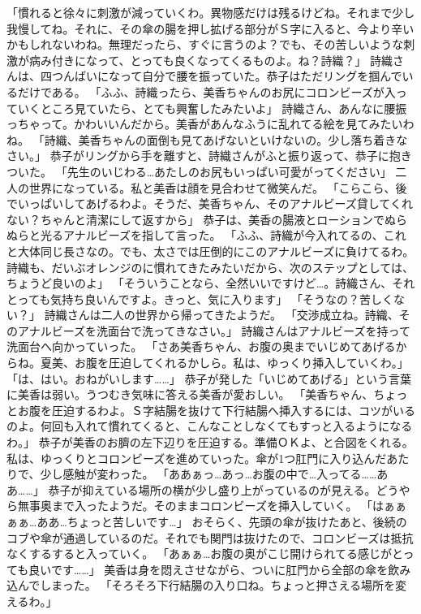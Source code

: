 「慣れると徐々に刺激が減っていくわ。異物感だけは残るけどね。それまで少し我慢してね。それに、その傘の腸を押し拡げる部分がＳ字に入ると、今より辛いかもしれないわね。無理だったら、すぐに言うのよ？でも、その苦しいような刺激が病み付きになって、とっても良くなってくるものよ。ね？詩織？」
詩織さんは、四つんばいになって自分で腰を振っていた。恭子はただリングを掴んでいるだけである。
「ふふ、詩織ったら、美香ちゃんのお尻にコロンビーズが入っていくところ見ていたら、とても興奮したみたいよ」
詩織さん、あんなに腰振っちゃって。かわいいんだから。美香があんなふうに乱れてる絵を見てみたいわね。
「詩織、美香ちゃんの面倒も見てあげないといけないの。少し落ち着きなさい。」
恭子がリングから手を離すと、詩織さんがふと振り返って、恭子に抱きついた。
「先生のいじわる…あたしのお尻もいっぱい可愛がってください」
二人の世界になっている。私と美香は顔を見合わせて微笑んだ。
「こらこら、後でいっぱいしてあげるわよ。そうだ、美香ちゃん、そのアナルビーズ貸してくれない？ちゃんと清潔にして返すから」
恭子は、美香の腸液とローションでぬらぬらと光るアナルビーズを指して言った。
「ふふ、詩織が今入れてるの、これと大体同じ長さなの。でも、太さでは圧倒的にこのアナルビーズに負けてるわ。詩織も、だいぶオレンジのに慣れてきたみたいだから、次のステップとしては、ちょうど良いのよ」
「そういうことなら、全然いいですけど…。詩織さん、それとっても気持ち良いんですよ。きっと、気に入ります」
「そうなの？苦しくない？」
詩織さんは二人の世界から帰ってきたようだ。
「交渉成立ね。詩織、そのアナルビーズを洗面台で洗ってきなさい。」
詩織さんはアナルビーズを持って洗面台へ向かっていった。
「さあ美香ちゃん、お腹の奥までいじめてあげるからね。夏美、お腹を圧迫してくれるかしら。私は、ゆっくり挿入していくわ。」
「は、はい。おねがいします……」
恭子が発した「いじめてあげる」という言葉に美香は弱い。うつむき気味に答える美香が愛おしい。
「美香ちゃん、ちょっとお腹を圧迫するわよ。Ｓ字結腸を抜けて下行結腸へ挿入するには、コツがいるのよ。何回も入れて慣れてくると、こんなことしなくてもすっと入るようになるわ。」
恭子が美香のお臍の左下辺りを圧迫する。準備ＯＫよ、と合図をくれる。私は、ゆっくりとコロンビーズを進めていった。傘が1つ肛門に入り込んだあたりで、少し感触が変わった。
「ああぁっ…あっ…お腹の中で…入ってる……ああ……」
恭子が抑えている場所の横が少し盛り上がっているのが見える。どうやら無事奥まで入ったようだ。そのままコロンビーズを挿入していく。
「はぁぁぁぁ…ああ…ちょっと苦しいです…」
おそらく、先頭の傘が抜けたあと、後続のコブや傘が通過しているのだ。それでも関門は抜けたので、コロンビーズは抵抗なくするすると入っていく。
「あぁぁ…お腹の奥がこじ開けられてる感じがとっても良いです……」
美香は身を悶えさせながら、ついに肛門から全部の傘を飲み込んでしまった。
「そろそろ下行結腸の入り口ね。ちょっと押さえる場所を変えるわ。」
